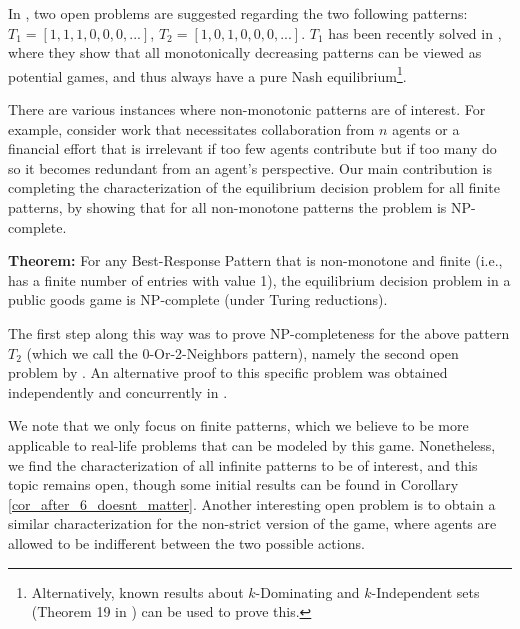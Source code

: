 \documentclass[runningheads]{llncs}
\begin{document}
In \cite{Gilboa_Nisan_public_goods}, two open problems are suggested regarding the two following patterns: $T_1=[1,1,1,0,0,0,...]$, $T_2=[1,0,1,0,0,0,...]$. $T_1$ has been recently solved in \cite{Monotone_Case}, where they show that all monotonically decreasing patterns can be viewed as potential games, and thus always have a pure Nash equilibrium\footnote{Alternatively, known results about $k$-Dominating and $k$-Independent sets (Theorem 19 in \cite{k_dominating_independent_set}) can be used to prove this.\label{Sigal_Oren_footnote}}. 

There are various instances where non-monotonic patterns are of interest. For example, consider work that necessitates collaboration from $n$ agents or a financial effort that is irrelevant if too few agents contribute but if too many do so it becomes redundant from an agent's perspective. Our main contribution is completing the characterization of the equilibrium decision problem for all finite patterns, by showing that for all non-monotone patterns the problem is NP-complete.

\vspace{0.1in}
\noindent
{\bf Theorem:} For any Best-Response Pattern that is non-monotone and finite (i.e., has a finite number of entries with value 1), the equilibrium decision problem in a public goods game is NP-complete (under Turing reductions).
\vspace{0.1in}

The first step along this way was to prove NP-completeness for the above pattern $T_2$ (which we call the 0-Or-2-Neighbors pattern), namely the second open problem by \cite{Gilboa_Nisan_public_goods}. An alternative proof to this specific problem was obtained independently and concurrently in \cite{Monotone_Case}.

We note that we only focus on finite patterns, which we believe to be more applicable to real-life problems that can be modeled by this game. Nonetheless, we find the characterization of all infinite patterns to be of interest, and this topic remains open, though some initial results can be found in Corollary \ref{cor_after_6_doesnt_matter}. Another interesting open problem is to obtain a similar characterization for the non-strict version of the game, where agents are allowed to be indifferent between the two possible actions.
\end{document}
